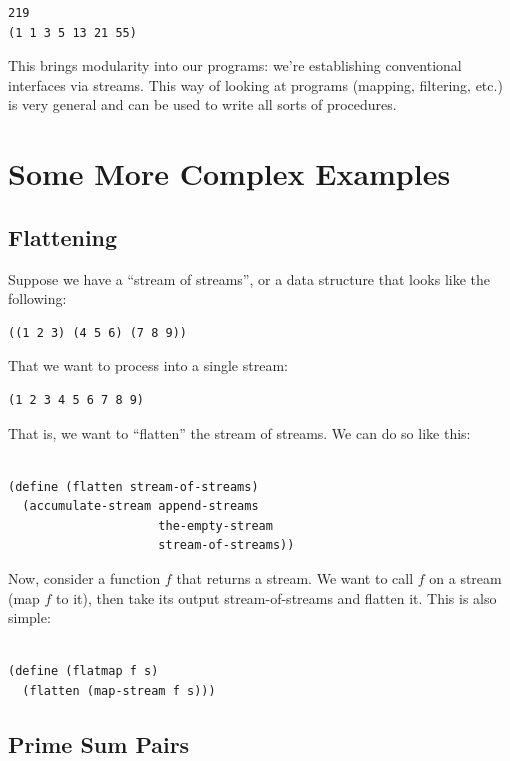 \documentclass[9pt]{report}
\begin{document}
\begin{verbatim}
219
(1 1 3 5 13 21 55)
\end{verbatim}


This brings modularity into our programs: we're establishing
conventional interfaces via streams. This way of looking at
programs (mapping, filtering, etc.) is very general and can be used
to write all sorts of procedures.


\section{Some More Complex Examples}
\label{sec:org7b87e12}

\subsection{Flattening}
\label{sec:orgad5f5d4}

Suppose we have a ``stream of streams'', or a data structure that
looks like the following:
\begin{verbatim}
((1 2 3) (4 5 6) (7 8 9))
\end{verbatim}

That we want to process into a single stream:
\begin{verbatim}
(1 2 3 4 5 6 7 8 9)
\end{verbatim}

That is, we want to ``flatten'' the stream of streams. We can do so
like this:

\begin{verbatim}

(define (flatten stream-of-streams)
  (accumulate-stream append-streams
                     the-empty-stream
                     stream-of-streams))
\end{verbatim}

Now, consider a function \(f\) that returns a stream. We want to
call \(f\) on a stream (map \(f\) to it), then take its output
stream-of-streams and flatten it. This is also simple:

\begin{verbatim}

(define (flatmap f s)
  (flatten (map-stream f s)))
\end{verbatim}

\subsection{Prime Sum Pairs}
\label{sec:orga011a1f}
\end{document}

